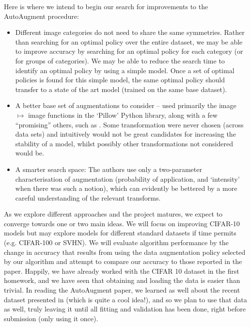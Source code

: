 \documentclass[10pt,twocolumn,letterpaper]{article}
\begin{document}
Here is where we intend to begin our search for improvements to the AutoAugment procedure:


\begin{itemize}
\item %
Different image categories do not need to share the same symmetries. Rather than searching for an optimal policy over the entire dataset, we may be able to improve accuracy by searching for an optimal policy for each category (or for groups of categories).
We may be able to reduce the search time to identify an optimal policy by using a simple model. Once a set of optimal policies is found for this simple model, the same optimal policy should transfer to a state of the art model (trained on the same base dataset).
\item A better base set of augmentations to consider -- \cite{Cubuk2018} used primarily the image $\mapsto$ image functions in the ‘Pillow’ Python library, along with a few ``promising'' others, such as \cite{Devries2017}. Some transformation were never chosen (across data sets) and intuitively would not be great candidates for increasing the stability of a model, whilst possibly other transformations not considered would be.
\item A smarter search space: The authors use only a two-parameter characterisation of augmentation (probability of application, and ‘intensity’ when there was such a notion), which can evidently be bettered by a more careful understanding of the relevant transforms.
\end{itemize}

As we explore different approaches and the project matures, we expect to converge towards one or two main ideas. We will focus on improving CIFAR-10 models but may explore models for different standard datasets if time permits (e.g. CIFAR-100 or SVHN). We will evaluate algorithm performance by the change in accuracy that results from using the data augmentation policy selected by our algorithm and attempt to compare our accuracy to those reported in the paper. Happily, we have already worked with the CIFAR 10 dataset in the first homework, and we have seen that obtaining and loading the data is easier than trivial. In reading the AutoAugment paper, we learned as well about the recent dataset presented in \cite{Recht2018} (which is quite a cool idea!), and so we plan to use that data as well, truly leaving it until all fitting and validation has been done, right before submission (only using it once).
\end{document}
